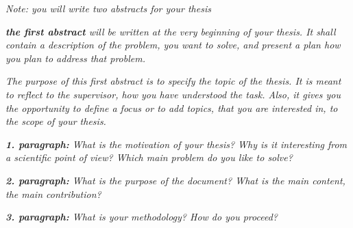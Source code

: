 
\textit{Note: you will write two abstracts for your thesis}

\textit{
	\textbf{the first abstract} will be written at the very beginning of your thesis.
	It shall contain a description of the problem, you want to solve, and present a plan how you plan to address that problem.
}

\textit{
	The purpose of this first abstract is to specify the topic of the thesis.
	It is meant to reflect to the supervisor, how you have understood the task.
	Also, it gives you the opportunity to define a focus or to add topics, that you are interested in, to the scope of your thesis.
}

\textit{\textbf{1. paragraph:} What is the motivation of your thesis? Why is it interesting from a scientific point of view? Which main problem do you like to solve?}

\textit{\textbf{2. paragraph:} What is the purpose of the document? What is the main content, the main contribution?}

\textit{\textbf{3. paragraph:} What is your methodology? How do you proceed?}
